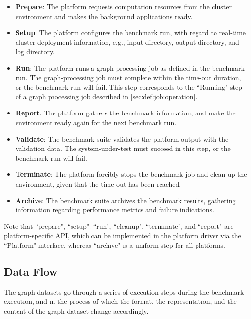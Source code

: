 \begin{itemize}
    \item \textbf{Prepare}: The platform requests computation resources from the cluster environment and makes the background applications ready.
    
    \item \textbf{Setup}: The platform configures the benchmark run, with regard to real-time cluster deployment information, e.g., input directory, output directory, and log directory.
    
    \item \textbf{Run}: The platform runs a graph-processing job as defined in the benchmark run. The graph-processing job must complete within the time-out duration, or the benchmark run will fail. This step corresponds to the ``Running" step of a graph processing job described in \ref{sec:def:job:operation}.
    
    \item \textbf{Report}: The platform gathers the benchmark information, and make the environment ready again for the next benchmark run.
    
    \item \textbf{Validate}: The benchmark suite validates the platform output with the validation data. The system-under-test must succeed in this step, or the benchmark run will fail.
    
    \item \textbf{Terminate}: The platform forcibly stops the benchmark job and clean up the environment, given that the time-out has been reached. 
    
    \item \textbf{Archive}: The benchmark suite archives the benchmark results, gathering information regarding performance metrics and failure indications.
\end{itemize}

Note that ``prepare", ``setup", ``run", ``cleanup", ``terminate", and ``report" are platform-specific API, which can be implemented in the platform driver via the ``Platform" interface, whereas ``archive" is a uniform step for all platforms. 


\subsection{Data Flow}
\label{sec:process:execution:data_flow}
The graph datasets go through a series of execution steps during the benchmark execution, and in the process of which the format, the representation, and the content of the graph dataset change accordingly.

